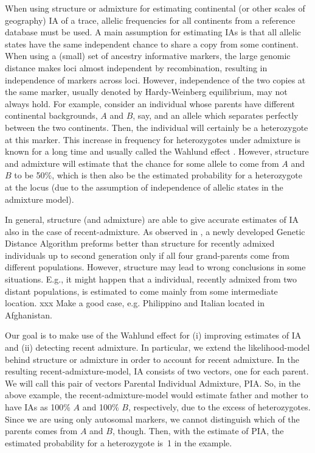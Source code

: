 \documentclass[12pt]{article}
\theoremstyle{definition}
\begin{document}
When using {\sc structure} or {\sc admixture} for estimating
continental (or other scales of geography) IA of a trace, allelic
frequencies for all continents from a reference database must be
used. A main assumption for estimating IAs is that all allelic states
have the same independent chance to share a copy from some continent.
When using a (small) set of ancestry informative markers, the large
genomic distance makes loci almost independent by recombination,
resulting in independence of markers across loci. However,
independence of the two copies at the same marker, usually denoted by
Hardy-Weinberg equilibrium, may not always hold. For example, consider
an individual whose parents have different continental backgrounds,
$A$ and $B$, say, and an allele which separates perfectly between the
two continents. Then, the individual will certainly be a heterozygote
at this marker. This increase in frequency for heterozygotes under
admixture is known for a long time and usually called the Wahlund
effect \cite{Wahlund1928}.  However, {\sc structure} and {\sc
  admixture} will estimate that the chance for some allele to come
from $A$ and $B$ to be 50\%, which is then also be the estimated
probability for a heterozygote at the locus (due to the assumption of
independence of allelic states in the admixture model).

In general, {\sc structure} (and {\sc admixture}) are able to give
accurate estimates of IA also in the case of recent-admixture.  As
observed in \cite{Cheung2018}, a newly developed Genetic Distance
Algorithm preforms better than {\sc structure} for recently admixed
individuals up to second generation only if all four grand-parents
come from different populations. However, {\sc structure} may lead to
wrong conclusions in some situations. E.g., it might happen that a
individual, recently admixed from two distant populations, is
estimated to come mainly from some intermediate location.
{\color{blue} xxx Make a good case, e.g. Philippino and Italian
  located in Afghanistan.}

Our goal is to make use of the Wahlund effect for (i) improving
estimates of IA and (ii) detecting recent admixture.  In particular,
we extend the likelihood-model behind {\sc structure} or {\sc
  admixture} in order to account for recent admixture. In the
resulting recent-admixture-model, IA consists of two vectors, one for
each parent. We will call this pair of vectors Parental Individual
Admixture, PIA. So, in the above example, the recent-admixture-model
would estimate father and mother to have IAs as 100\% $A$ and 100\%
$B$, respectively, due to the excess of heterozygotes.  Since we are
using only autosomal markers, we cannot distinguish which of the
parents comes from $A$ and $B$, though. Then, with the estimate of
PIA, the estimated probability for a heterozygote is~1 in the example.
\end{document}
